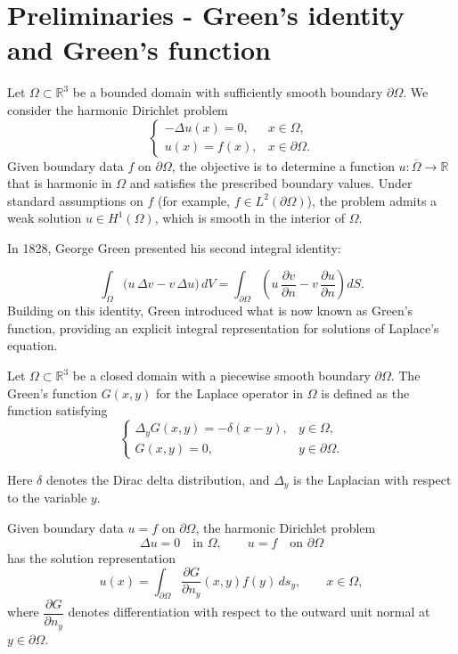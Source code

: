 \documentclass[12pt,oneside,reqno]{amsart}%
\theoremstyle{plain}
\numberwithin{equation}{section}
\begin{document}
\section{Preliminaries - Green's identity and Green's function}

Let $\Omega \subset \mathbb{R}^3$ be a bounded domain with sufficiently smooth boundary $\partial\Omega$. 
We consider the harmonic Dirichlet problem
\begin{equation}
\begin{cases}
-\Delta u(x) = 0, & x \in \Omega, \\
u(x) = f(x), & x \in \partial\Omega .
\end{cases}
\end{equation}
Given boundary data $f$ on $\partial\Omega$, the objective is to determine a function 
$u : \overline{\Omega} \to \mathbb{R}$ that is harmonic in $\Omega$ and satisfies the prescribed boundary values. 
Under standard assumptions on $f$ (for example, $f \in L^2(\partial\Omega)$), the problem admits a weak solution 
$u \in H^1(\Omega)$, which is smooth in the interior of $\Omega$.

In 1828, George Green presented his second integral identity:

\[
\int_{\Omega} \big( u \,\Delta v - v \,\Delta u \big)\, dV
  = \int_{\partial\Omega} 
      \left( 
          u \,\frac{\partial v}{\partial n}
          - v \,\frac{\partial u}{\partial n}
      \right) dS .
\]
Building on this identity, Green introduced what is now known as Green's function, providing an explicit integral representation for solutions of Laplace’s equation.

Let $\Omega \subset \mathbb{R}^3$ be a closed domain with a piecewise smooth boundary 
$\partial\Omega$.  
The Green's function $G(x,y)$ for the Laplace operator in $\Omega$ is defined as 
the function satisfying
\begin{equation}
\label{eq:Green-def}
\begin{cases}
\Delta_y G(x,y) = -\delta(x-y), & y \in \Omega, \\[4pt]
G(x,y) = 0, & y \in \partial\Omega .
\end{cases}
\end{equation}

Here $\delta$ denotes the Dirac delta distribution, and $\Delta_y$ is the Laplacian 
with respect to the variable $y$.

Given boundary data $u = f$ on $\partial\Omega$, the harmonic Dirichlet problem
\begin{equation}
\Delta u = 0 \quad \text{in } \Omega, 
\qquad u = f \quad \text{on } \partial\Omega
\end{equation}
has the solution representation \cite{Green1828}
\begin{equation}
\label{eq:GR}
u(x) 
= \int_{\partial\Omega}
    \frac{\partial G}{\partial n_y}(x,y)f(y)\, ds_y,
\qquad x \in \Omega,
\end{equation}
where $\dfrac{\partial G}{\partial n_y}$ denotes differentiation with respect 
to the outward unit normal at $y \in \partial\Omega$.
\end{document}
